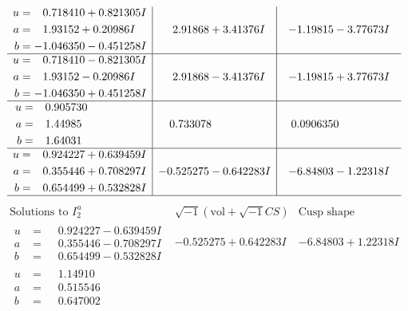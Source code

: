 \documentclass[1p]{elsarticle_modified}
\theoremstyle{definition}
\newcommand{\I}{\sqrt{-1}}
\begin{document}
$$\begin{array}{c|c|c}
\begin{aligned}
u &= \phantom{-}0.718410 + 0.821305 I \\
a &= \phantom{-}1.93152 + 0.20986 I \\
b &= -1.046350 - 0.451258 I\end{aligned}
 & \phantom{-}2.91868 + 3.41376 I & -1.19815 - 3.77673 I \\ \hline\begin{aligned}
u &= \phantom{-}0.718410 - 0.821305 I \\
a &= \phantom{-}1.93152 - 0.20986 I \\
b &= -1.046350 + 0.451258 I\end{aligned}
 & \phantom{-}2.91868 - 3.41376 I & -1.19815 + 3.77673 I \\ \hline\begin{aligned}
u &= \phantom{-}0.905730\phantom{ +0.000000I} \\
a &= \phantom{-}1.44985\phantom{ +0.000000I} \\
b &= \phantom{-}1.64031\phantom{ +0.000000I}\end{aligned}
 & \phantom{-}0.733078\phantom{ +0.000000I} & \phantom{-}0.0906350\phantom{ +0.000000I} \\ \hline\begin{aligned}
u &= \phantom{-}0.924227 + 0.639459 I \\
a &= \phantom{-}0.355446 + 0.708297 I \\
b &= \phantom{-}0.654499 + 0.532828 I\end{aligned}
 & -0.525275 - 0.642283 I & -6.84803 - 1.22318 I\\
 \hline 
 \end{array}$$\newpage$$\begin{array}{c|c|c}  
\text{Solutions to }I^u_{2}& \I (\text{vol} + \sqrt{-1}CS) & \text{Cusp shape}\\
 \hline 
\begin{aligned}
u &= \phantom{-}0.924227 - 0.639459 I \\
a &= \phantom{-}0.355446 - 0.708297 I \\
b &= \phantom{-}0.654499 - 0.532828 I\end{aligned}
 & -0.525275 + 0.642283 I & -6.84803 + 1.22318 I \\ \hline\begin{aligned}
u &= \phantom{-}1.14910\phantom{ +0.000000I} \\
a &= \phantom{-}0.515546\phantom{ +0.000000I} \\
b &= \phantom{-}0.647002\phantom{ +0.000000I}\end{aligned}

\end{array}$$
\end{document}
